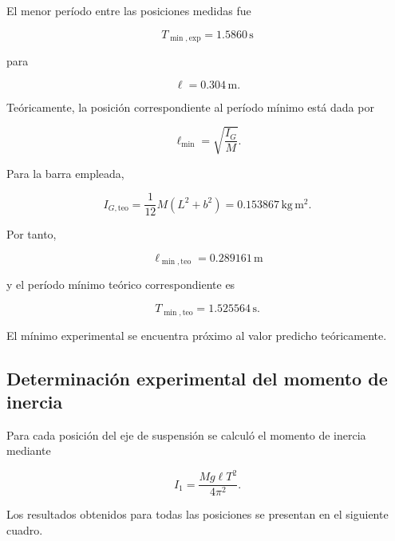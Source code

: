 \documentclass[11pt,a4paper]{article}
\begin{document}
\newpage
El menor período entre las posiciones medidas fue

\[
\boxed{
T_{\min,\mathrm{exp}}=1.5860\,\mathrm{s}
}
\]

para

\[
\boxed{
\ell=0.304\,\mathrm{m}
}.
\]

Teóricamente, la posición correspondiente al período mínimo está dada por

\[
\ell_{\min}=\sqrt{\frac{I_G}{M}}.
\]

Para la barra empleada,

\[
I_{G,\mathrm{teo}}
=
\frac{1}{12}M(L^2+b^2)
=
0.153867\,\mathrm{kg\,m^2}.
\]

Por tanto,

\[
\boxed{
\ell_{\min,\mathrm{teo}}
=
0.289161\,\mathrm{m}
}
\]

y el período mínimo teórico correspondiente es

\[
\boxed{
T_{\min,\mathrm{teo}}
=
1.525564\,\mathrm{s}
}.
\]

El mínimo experimental se encuentra próximo al valor predicho
teóricamente.

\subsection{Determinación experimental del momento de inercia}

Para cada posición del eje de suspensión se calculó el momento de
inercia mediante

\[
I_1=
\frac{Mg\ell T^2}{4\pi^2}.
\]

Los resultados obtenidos para todas las posiciones se presentan en el
siguiente cuadro.
\end{document}
